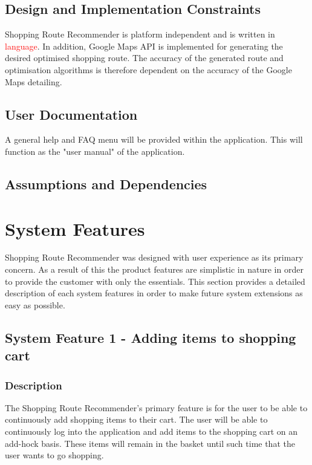 \documentclass[10pt, a4paper, onecolumn]{scrartcl}
\begin{document}
		\subsection{Design and Implementation Constraints}
		
			Shopping Route Recommender is platform independent and is written in \textcolor{red}{language}. In addition, Google Maps API is implemented for generating the desired optimised shopping route. The accuracy of the generated route and optimisation algorithms is therefore dependent on the accuracy of the Google Maps detailing. 
		
		\subsection{User Documentation}
		
		   	A general help and FAQ menu will be provided within the application. This will function as the "user manual" of the application. 
		
		\subsection{Assumptions and Dependencies}
	
	\section{System Features}
	
		Shopping Route Recommender was designed with user experience as its primary concern. As a result of this the product features are simplistic in nature in order to provide the customer with only the essentials.	This section provides a detailed description of each system features in order to make future system extensions as easy as possible. 
	
		\subsection{System Feature 1 - Adding items to shopping cart}
		\label{featureadd}
		
			\subsubsection{Description}
			
				The Shopping Route Recommender's primary feature is for the user to be able to continuously add shopping items to their cart. The user will be able to continuously log into the application and add items to the shopping cart on an add-hock basis. These items will remain in the basket until such time that the user wants to go shopping. 
			
\end{document}
